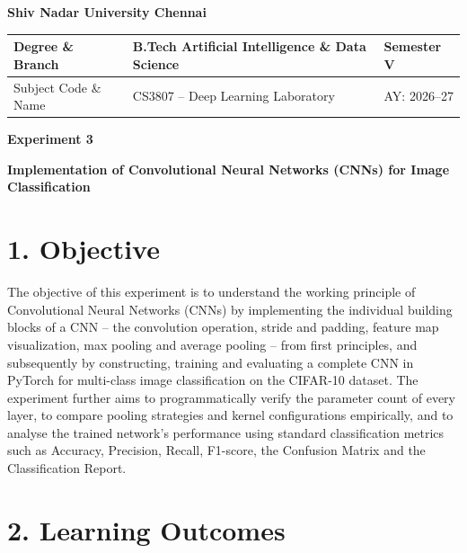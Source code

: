\documentclass[11pt,a4paper]{article}
\begin{document}
\raggedbottom

\setlength{\textfloatsep}{10pt}
\setlength{\floatsep}{8pt}
\setlength{\intextsep}{8pt}


\begin{center}

{\Large \textbf{Shiv Nadar University Chennai}}

\vspace{0.3cm}

\begin{tabular}{|p{4cm}|p{8cm}|p{2cm}|}
\hline
Degree \& Branch &
B.Tech Artificial Intelligence \& Data Science &
Semester V\\
\hline
Subject Code \& Name &
CS3807 -- Deep Learning Laboratory &
AY: 2026--27\\
\hline
\end{tabular}

\vspace{0.7cm}

{\Large \textbf{Experiment 3}}

\vspace{0.2cm}

{\large \textbf{Implementation of Convolutional Neural Networks (CNNs) for Image Classification}}

\end{center}

\section*{1. Objective}

The objective of this experiment is to understand the working principle of Convolutional Neural Networks (CNNs) by implementing the individual building blocks of a CNN -- the convolution operation, stride and padding, feature map visualization, max pooling and average pooling -- from first principles, and subsequently by constructing, training and evaluating a complete CNN in PyTorch for multi-class image classification on the CIFAR-10 dataset. The experiment further aims to programmatically verify the parameter count of every layer, to compare pooling strategies and kernel configurations empirically, and to analyse the trained network's performance using standard classification metrics such as Accuracy, Precision, Recall, F1-score, the Confusion Matrix and the Classification Report.

\section*{2. Learning Outcomes}
\end{document}
